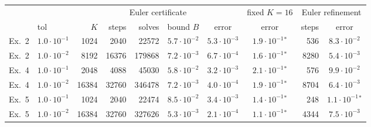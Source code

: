 \setlength{\tabcolsep}{3.2pt}\footnotesize\begin{tabular}{ll|rrrcc|c|rc}
\hline
 & & \multicolumn{5}{c}{Euler certificate} & fixed $K=16$ & \multicolumn{2}{c}{Euler refinement} \\
 & tol & $K$ & steps & solves & bound $B$ & error & error & steps & error \\
\hline
Ex.~2 & $1.0\!\cdot\!10^{-1}$ & 1024 & 2040 & 22572 & $5.7\!\cdot\!10^{-2}$ & $5.3\!\cdot\!10^{-3}$ & $1.9\!\cdot\!10^{-1}$$^\ast$ & 536 & $8.3\!\cdot\!10^{-2}$ \\
Ex.~2 & $1.0\!\cdot\!10^{-2}$ & 8192 & 16376 & 179868 & $7.2\!\cdot\!10^{-3}$ & $6.7\!\cdot\!10^{-4}$ & $1.6\!\cdot\!10^{-1}$$^\ast$ & 8280 & $5.4\!\cdot\!10^{-3}$ \\
Ex.~4 & $1.0\!\cdot\!10^{-1}$ & 2048 & 4088 & 45030 & $5.8\!\cdot\!10^{-2}$ & $3.2\!\cdot\!10^{-3}$ & $2.1\!\cdot\!10^{-1}$$^\ast$ & 576 & $9.9\!\cdot\!10^{-2}$ \\
Ex.~4 & $1.0\!\cdot\!10^{-2}$ & 16384 & 32760 & 346478 & $7.2\!\cdot\!10^{-3}$ & $4.0\!\cdot\!10^{-4}$ & $1.9\!\cdot\!10^{-1}$$^\ast$ & 8704 & $6.4\!\cdot\!10^{-3}$ \\
Ex.~5 & $1.0\!\cdot\!10^{-1}$ & 1024 & 2040 & 22474 & $8.5\!\cdot\!10^{-2}$ & $3.4\!\cdot\!10^{-3}$ & $1.4\!\cdot\!10^{-1}$$^\ast$ & 248 & $1.1\!\cdot\!10^{-1}$$^\ast$ \\
Ex.~5 & $1.0\!\cdot\!10^{-2}$ & 16384 & 32760 & 327626 & $5.3\!\cdot\!10^{-3}$ & $2.1\!\cdot\!10^{-4}$ & $1.1\!\cdot\!10^{-1}$$^\ast$ & 4344 & $7.5\!\cdot\!10^{-3}$ \\
\hline
\end{tabular}

